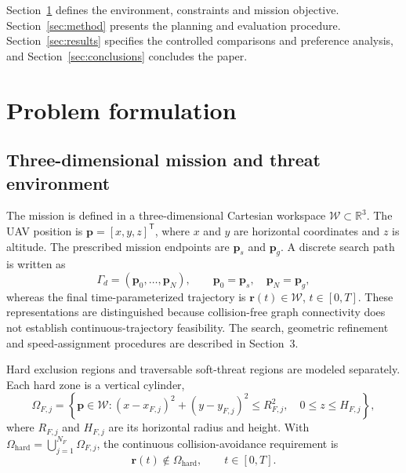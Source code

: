 \documentclass[preprint,12pt]{elsarticle}
\begin{document}
Section~\ref{pr:sec:problem} defines the environment, constraints and mission
objective. Section~\ref{sec:method} presents the planning and evaluation
procedure. Section~\ref{sec:results} specifies the controlled comparisons
and preference analysis, and Section~\ref{sec:conclusions} concludes the paper.


\section{Problem formulation}
\label{pr:sec:problem}

\subsection{Three-dimensional mission and threat environment}
\label{pr:sec:environment}
The mission is defined in a three-dimensional Cartesian workspace
$\mathcal{W}\subset\mathbb{R}^{3}$. The UAV position is
$\mathbf{p}=[x,y,z]^{\mathsf T}$, where $x$ and $y$ are horizontal
coordinates and $z$ is altitude. The prescribed mission endpoints are
$\mathbf{p}_{s}$ and $\mathbf{p}_{g}$. A discrete search path is written as
\begin{equation}
 \Gamma_d=(\mathbf{p}_0,\ldots,\mathbf{p}_N),\qquad
 \mathbf{p}_0=\mathbf{p}_{s},\quad \mathbf{p}_N=\mathbf{p}_{g},
 \label{pr:eq:discrete}
\end{equation}
whereas the final time-parameterized trajectory is
$\mathbf{r}(t)\in\mathcal{W}$, $t\in[0,T]$. These representations are
distinguished because collision-free graph connectivity does not establish
continuous-trajectory feasibility. The search, geometric refinement and
speed-assignment procedures are described in Section~3.

Hard exclusion regions and traversable soft-threat regions are modeled
separately. Each hard zone is a vertical cylinder,
\begin{equation}
 \Omega_{F,j}=\left\{\mathbf{p}\in\mathcal{W}:
 (x-x_{F,j})^2+(y-y_{F,j})^2\le R_{F,j}^{2},\quad
 0\le z\le H_{F,j}\right\},
 \label{pr:eq:hardzone}
\end{equation}
where $R_{F,j}$ and $H_{F,j}$ are its horizontal radius and height. With
$\Omega_{\mathrm{hard}}=\bigcup_{j=1}^{N_F}\Omega_{F,j}$, the continuous
collision-avoidance requirement is
\begin{equation}
 \mathbf{r}(t)\notin\Omega_{\mathrm{hard}},\qquad t\in[0,T].
 \label{pr:eq:collision}
\end{equation}
\end{document}
